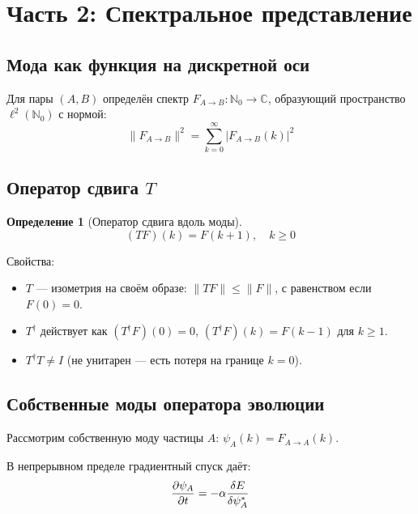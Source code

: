 \documentclass[11pt,a4paper]{article}
\newtheorem{definition}{Определение}[section]
\theoremstyle{definition}
\begin{document}
\newpage
\section{Часть 2: Спектральное представление}

\subsection{Мода как функция на дискретной оси}

Для пары $(A, B)$ определён спектр $F_{A \to B} : \mathbb{N}_0 \to \mathbb{C}$, образующий пространство $\ell^2(\mathbb{N}_0)$ с нормой:
\begin{equation}
    \|F_{A \to B}\|^2 = \sum_{k=0}^{\infty} |F_{A \to B}(k)|^2
\end{equation}

\subsection{Оператор сдвига $T$}

\begin{definition}[Оператор сдвига вдоль моды]
\begin{equation}
    (T F)(k) = F(k+1), \quad k \geq 0
\end{equation}
\end{definition}

Свойства:
\begin{itemize}
    \item $T$ --- изометрия на своём образе: $\|T F\| \leq \|F\|$, с равенством если $F(0) = 0$.
    \item $T^\dagger$ действует как $(T^\dagger F)(0) = 0$, $(T^\dagger F)(k) = F(k-1)$ для $k \geq 1$.
    \item $T^\dagger T \neq I$ (не унитарен --- есть потеря на границе $k=0$).
\end{itemize}

\subsection{Собственные моды оператора эволюции}

Рассмотрим собственную моду частицы $A$: $\psi_A(k) = F_{A \to A}(k)$.

В непрерывном пределе градиентный спуск даёт:
\begin{equation}
    \pdv{\psi_A}{t} = -\alpha \frac{\delta E}{\delta \psi_A^*}
\end{equation}
\end{document}
